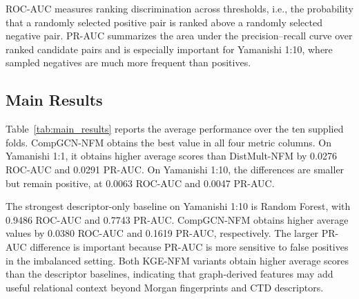 ROC-AUC measures ranking discrimination across thresholds, i.e., the probability that a randomly selected positive pair is ranked above a randomly selected negative pair. PR-AUC summarizes the area under the precision--recall curve over ranked candidate pairs and is especially important for Yamanishi 1:10, where sampled negatives are much more frequent than positives.

\subsection{Main Results}
\label{sec:main_results}

\begin{table}[!htbp]
\centering
\caption{Average DTI prediction performance on Yamanishi08 warm-start settings.}
\label{tab:main_results}
\small
\setlength{\tabcolsep}{3pt}
\end{table}

Table~\ref{tab:main_results} reports the average performance over the ten supplied folds. CompGCN-NFM obtains the best value in all four metric columns. On Yamanishi 1:1, it obtains higher average scores than DistMult-NFM by 0.0276 ROC-AUC and 0.0291 PR-AUC. On Yamanishi 1:10, the differences are smaller but remain positive, at 0.0063 ROC-AUC and 0.0047 PR-AUC.

The strongest descriptor-only baseline on Yamanishi 1:10 is Random Forest, with 0.9486 ROC-AUC and 0.7743 PR-AUC. CompGCN-NFM obtains higher average values by 0.0380 ROC-AUC and 0.1619 PR-AUC, respectively. The larger PR-AUC difference is important because PR-AUC is more sensitive to false positives in the imbalanced setting. Both KGE-NFM variants obtain higher average scores than the descriptor baselines, indicating that graph-derived features may add useful relational context beyond Morgan fingerprints and CTD descriptors.

